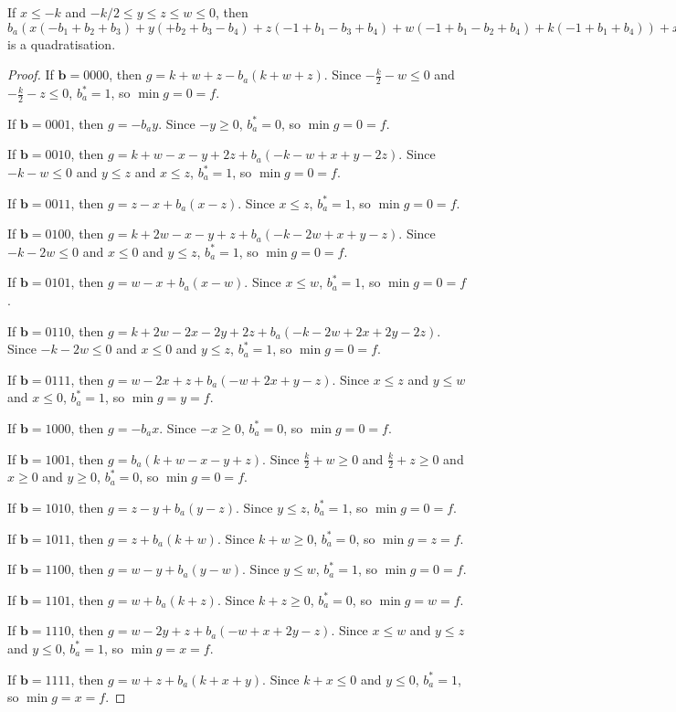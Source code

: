 \documentclass[11pt]{scrartcl}
\newcommand{\vc}[1]{\boldsymbol{#1}}
\begin{document}
\begin{lemma}
	If  $x\le -k$ and $-k/2\le y \le z \le w \le 0$, then 
$b_a(x(-b_1+b_2+b_3)+y(+b_2+b_3-b_4)+z(-1+b_1-b_3+b_4)+w(-1+b_1-b_2+b_4)+k(-1+b_1+b_4))+x(-b_2-b_3+b_1b_2+b_1b_3)+y(-b_2-b_3+b_2b_4+b_3b_4)+z(+1-b_1+b_3-b_4+b_1b_4)+w(+1-b_1+b_2-b_4+b_1b_4)+k(+1-b_1-b_4+b_1b_4)$
	is a quadratisation.

\end{lemma}

\begin{proof}
	If $\vc b = 0000$, then $g = k + w + z - b_a(k + w + z)$. Since $-\frac{k}{2} - w \le 0$ and $-\frac{k}{2} - z \le 0$, $b_a^* = 1$, so $\min g = 0 = f$.

If $\vc b = 0001$, then $g = -b_ay$. Since $-y \ge 0$, $b_a^* = 0$, so $\min g = 0 = f$.

If $\vc b = 0010$, then $g = k + w - x - y + 2z + b_a(-k - w + x + y - 2z)$. Since $-k - w\le 0$ and $y \le z$ and $x \le z$, $b_a^* = 1$, so $\min g = 0 = f$.

If $\vc b = 0011$, then $g = z - x + b_a(x - z)$. Since $x \le z$, $b_a^* = 1$, so $\min g = 0 = f$.

If $\vc b = 0100$, then $g = k + 2w - x - y + z + b_a(-k - 2w + x + y - z)$. Since $-k - 2w \le 0$ and $x \le 0$ and $y \le z$, $b_a^* = 1$, so $\min g = 0 = f$.

If $\vc b = 0101$, then $g = w - x + b_a(x - w)$. Since $x \le w$, $b_a^* = 1$, so $\min g = 0 = f$. 

If $\vc b = 0110$, then $g = k + 2w - 2x - 2y + 2z + b_a(-k - 2w +2x + 2y - 2z)$. Since $-k - 2w \le 0$ and $x \le 0$ and $y \le z$, $b_a^* = 1$, so $\min g = 0 = f$.


If $\vc b = 0111$, then $g = w - 2x + z + b_a (-w + 2x + y - z)$. Since $x \le z$ and $y \le w$ and $x \le 0$, $b_a^* = 1$, so $\min g = y = f$.

If $\vc b = 1000$, then $g = -b_ax$. Since $-x \ge 0$, $b_a^* = 0$, so $\min g = 0 = f$.

If $\vc b = 1001$, then $g = b_a(k + w - x - y + z)$. Since $\frac{k}{2} + w \ge 0 $ and $\frac{k}{2} + z \ge 0$ and $x \ge 0 $ and $y \ge 0$, $b_a^* = 0$, 
so $\min g = 0 = f$.

If $\vc b = 1010$, then $g = z - y + b_a(y - z)$. Since $y \le z$, $b_a^* = 1$, so $\min g = 0  = f$.

If $\vc b = 1011$, then $g = z + b_a(k + w)$. Since $k + w \ge 0$, $b_a^* = 0$, so $\min g = z = f$.

If $\vc b = 1100$, then $g = w - y + b_a(y -w)$. Since $y \le w$, $b_a^* = 1$, so $\min g = 0 = f$. 

If $\vc b = 1101$, then $g = w + b_a(k + z)$. Since $k+z \ge 0$, $b_a^* = 0$, so $\min g = w = f$.

If $\vc b = 1110$, then $g = w - 2y + z + b_a(-w + x + 2y - z)$. Since $x \le w$ and $y \le z$ and $y \le 0$, $b_a^* = 1$, so $\min g = x = f$.

If $\vc b = 1111$, then $g = w + z + b_a(k + x + y)$. Since $k + x \le 0$ and $y \le 0 $, $b_a^* = 1$, so $\min g = x = f$.

\end{proof}	
\end{document}
